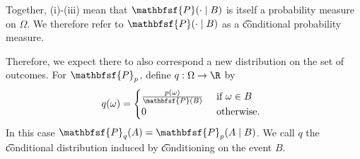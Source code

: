 Together, (i)-(iii) mean that $\mathbfsf{P} (\cdot \mid  B)$ is itself a probability measure on $\Omega $.
We therefore refer to $\mathbfsf{P} (\cdot \mid  B)$ as a \t{conditional probability measure}.

Therefore, we expect there to also correspond a new distribution on the set of outcomes.
For $\mathbfsf{P} _p$, define $q: \Omega  \to \R $ by
  \[
q(\omega ) = \begin{cases}
\frac{p(\omega )}{\mathbfsf{P} (B)} & \text{ if } \omega  \in B \\
0 & \text{ otherwise. } \\
\end{cases}
  \]
In this case $\mathbfsf{P} _q(A) = \mathbfsf{P} _p(A \mid  B)$.
We call $q$ the \t{conditional distribution} induced by \t{conditioning on} the event $B$.
